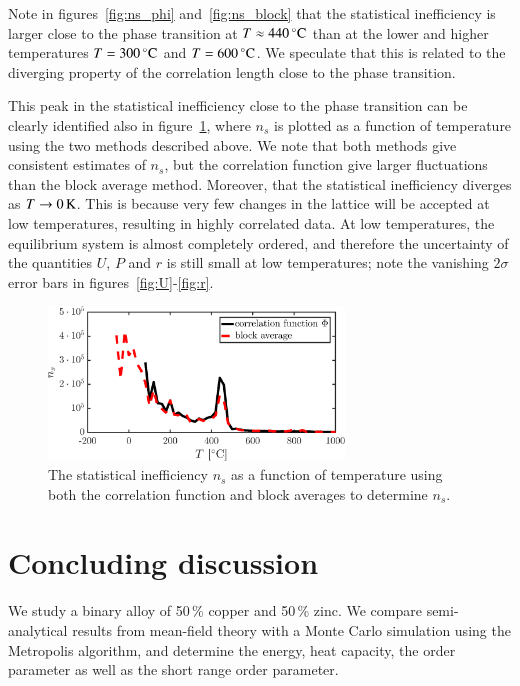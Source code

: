 Note in figures~\ref{fig:ns_phi} and~\ref{fig:ns_block} that the statistical inefficiency is larger close to the phase transition at $T \approx \unit[440]{^\circ C}$ than at the lower and higher temperatures  $T = \unit[300]{^\circ C}$ and $T = \unit[600]{^\circ C}$. We speculate that this is related to the diverging property of the correlation length close to the phase transition. 

This peak in the statistical inefficiency close to the phase transition can be clearly identified also in figure~\ref{fig:ns_both}, where $n_s$ is plotted as a function of temperature using the two methods described above. We note that both methods give consistent estimates of $n_s$, but the correlation function give larger fluctuations than the block average method. Moreover, that the statistical inefficiency diverges as $T \rightarrow \unit[0]{K}$. This is because very few changes in the lattice will be accepted at low temperatures, resulting in highly correlated data. At low temperatures, the equilibrium system is almost completely ordered, and therefore the uncertainty of the quantities $U$, $P$ and $r$ is still small at low temperatures; note the vanishing $2\sigma$ error bars in figures~\ref{fig:U}-\ref{fig:r}. 

\begin{figure}[!ht]
\begin{center}
  \includegraphics[width=0.7\textwidth]{../figures/stat_inefficiency_both} 
  \caption{The statistical inefficiency $n_s$ as a function of temperature using both the correlation function and block averages to determine $n_s$.}
  \label{fig:ns_both}
\end{center}
\end{figure}

\section*{Concluding discussion}
We study a binary alloy of 50\,\% copper and 50\,\% zinc. We compare
semi-analytical results from mean-field theory with a Monte Carlo
simulation using the Metropolis algorithm, and determine the energy,
heat capacity, the order parameter as well as the short range order
parameter. 

